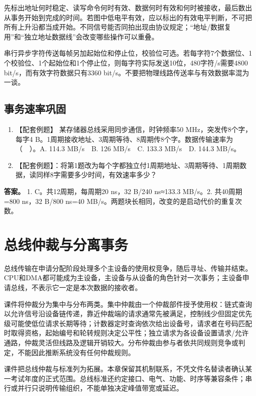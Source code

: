 先标出地址何时稳定、读写命令何时有效、数据何时有效和何时被接收，最后数出从事务开始到完成的时间。若图中低电平有效，应以标出的有效电平判断，不可把所有上升沿都当成开始。不同信号能否同拍出现由协议规定；``地址/数据复用''和``独立地址数据线''会改变哪些操作可以重叠。

串行异步字符传送每帧另加起始位和停止位，校验位可选。若每字符7个数据位、1个校验位、1个起始位和1个停止位，则每字符实际发送10位，480字符/s需要4800 bit/s，而有效字符数据只有3360 bit/s。不要把物理线路传送率与有效数据率混为一谈。

\subsection{事务速率巩固}\label{CO06-old-self}

\begin{enumerate}
\def\labelenumi{\arabic{enumi}.}
\tightlist
\item
  【配套例题】 某存储器总线采用同步通信，时钟频率50 MHz，突发传8个字，每字4 B。1周期接收地址、3周期等待、8周期传8个字。数据传输速率为（　）。A. 114.3 MB/s　B. 126 MB/s　C. 133.3 MB/s　D. 144.3 MB/s。
\item
  【配套例题】：将第1题改为每个字都独立付1周期地址、3周期等待、1周期数据，读同样8字需要多少时间，有效速率多少？
\end{enumerate}

\textbf{答案。} 1. C。共12周期，每周期20 ns，32 B/240 ns≈133.3 MB/s。2. 共40周期=800 ns，32 B/800 ns=40 MB/s。两题块长相同，改变的是启动代价的重复次数。

\section{总线仲裁与分离事务}\label{CO06-arbitration}

总线传输在申请分配阶段处理多个主设备的使用权竞争，随后寻址、传输并结束。CPU和DMA都可能成为主设备，主设备与从设备的角色针对一次事务；主设备申请总线，不表示它一定是本次数据的接收者。

课件将仲裁分为集中与分布两类。集中仲裁由一个仲裁部件授予使用权：链式查询以允许信号沿设备链传递，靠近仲裁端的请求通常先被满足，控制线少但固定优先级可能使低位请求长期等待；计数器定时查询依次给出设备号，请求者在号码匹配时取得资格，起始编号和轮转规则决定公平性；独立请求为各设备设置请求/允许通路，仲裁灵活但线路及逻辑开销较大。分布仲裁由参与者依共同规则竞争或判定，不能因此推断系统没有任何仲裁规则。

课件把总线仲裁与标准列为拓展。本章保留其机制联系，不凭文件名替读者确认某一考试年度的正式范围。总线标准还约定接口、电气、功能、时序等兼容条件；串行或并行只说明传输组织，不能单独决定峰值带宽或延迟。

